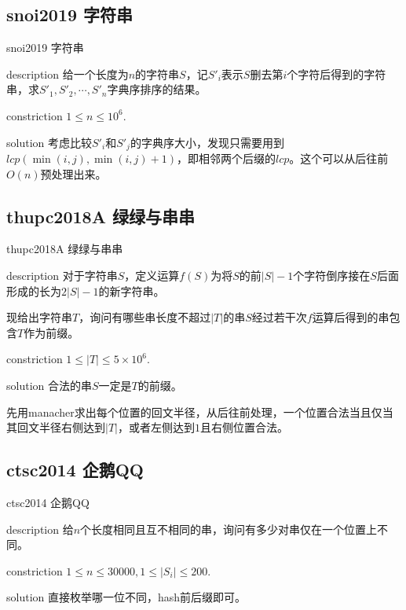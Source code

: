 \documentclass{beamer}
\begin{document}
\subsection{snoi2019 字符串}
\begin{frame}{snoi2019 字符串}
	\begin{block}{description}
		给一个长度为$n$的字符串$S$，记$S'_i$表示$S$删去第$i$个字符后得到的字符串，求$S'_1, S'_2, \cdots, S'_n$字典序排序的结果。
	\end{block}
	\begin{block}{constriction}
		$1 \le n \le 10^6.$
	\end{block}
	\pause
	\begin{block}{solution}
		考虑比较$S'_i$和$S'_j$的字典序大小，发现只需要用到$lcp(\min(i,j),\min(i,j)+1)$，即相邻两个后缀的$lcp$。这个可以从后往前$O(n)$预处理出来。
	\end{block}
\end{frame}
\subsection{thupc2018A 绿绿与串串}
\begin{frame}{thupc2018A 绿绿与串串}
	\begin{block}{description}
		对于字符串$S$，定义运算$f(S)$为将$S$的前$|S|-1$个字符倒序接在$S$后面形成的长为$2|S|-1$的新字符串。
		
		现给出字符串$T$，询问有哪些串长度不超过$|T|$的串$S$经过若干次$f$运算后得到的串包含$T$作为前缀。
	\end{block}
	\begin{block}{constriction}
		$1 \le |T| \le 5 \times 10^6.$
	\end{block}
	\pause
	\begin{block}{solution}
		合法的串$S$一定是$T$的前缀。
		
		先用manacher求出每个位置的回文半径，从后往前处理，一个位置合法当且仅当其回文半径右侧达到$|T|$，或者左侧达到$1$且右侧位置合法。
	\end{block}
\end{frame}
\subsection{ctsc2014 企鹅QQ}
\begin{frame}{ctsc2014 企鹅QQ}
	\begin{block}{description}
		给$n$个长度相同且互不相同的串，询问有多少对串仅在一个位置上不同。
	\end{block}
	\begin{block}{constriction}
		$1 \le n \le 30000, 1 \le |S_i| \le 200.$
	\end{block}
	\pause
	\begin{block}{solution}
		直接枚举哪一位不同，hash前后缀即可。
	\end{block}
\end{frame}
\end{document}
